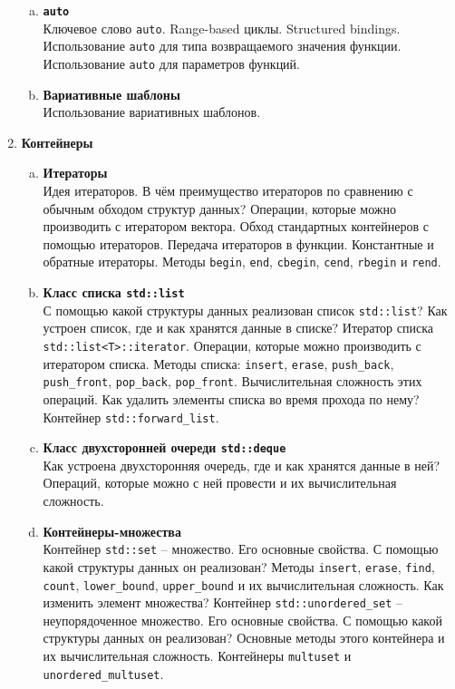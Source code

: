 \documentclass{article}
\begin{document}
\begin{enumerate}
\begin{enumerate}[a.]
\item \textbf{\texttt{auto}}\\
Ключевое слово \texttt{auto}. Range-based циклы. Structured bindings.
Использование \texttt{auto} для типа возвращаемого значения функции. Использование \texttt{auto} для параметров функций.


\item \textbf{Вариативные шаблоны}\\
Использование вариативных шаблонов.
\end{enumerate}




\item \textbf{Контейнеры}
\begin{enumerate}[a.]

\item \textbf{Итераторы}\\
Идея итераторов. В чём преимущество итераторов по сравнению с обычным обходом структур данных? Операции, которые можно производить с итератором вектора. Обход стандартных контейнеров с помощью итераторов. Передача итераторов в функции. Константные и обратные итераторы. Методы \texttt{begin}, \texttt{end}, \texttt{cbegin}, \texttt{cend}, \texttt{rbegin} и \texttt{rend}.

\item \textbf{Класс списка \texttt{std::list}}\\
С помощью какой структуры данных реализован список \texttt{std::list}? Как устроен список, где и как хранятся данные в списке? Итератор списка \texttt{std::list<T>::iterator}. Операции, которые можно производить с итератором списка. Методы списка: \texttt{insert}, \texttt{erase}, \texttt{push\_back}, \texttt{push\_front}, \texttt{pop\_back}, \texttt{pop\_front}. Вычислительная сложность этих операций.  Как удалить элементы списка во время прохода по нему? 
Контейнер \texttt{std::forward\_list}.

\item \textbf{Класс двухсторонней очереди \texttt{std::deque}}\\
Как устроена двухсторонняя очередь, где и как хранятся данные в ней? Операций, которые можно с ней провести и их вычислительная сложность.

\item \textbf{Контейнеры-множества}\\
Контейнер \texttt{std::set} -- множество. Его основные свойства. С помощью какой структуры данных он реализован? Методы \texttt{insert}, \texttt{erase}, \texttt{find}, \texttt{count}, \texttt{lower\_bound}, \texttt{upper\_bound} и их вычислительная сложность. Как изменить элемент множества? Контейнер \texttt{std::unordered\_set} -- неупорядоченное множество. Его основные свойства. С помощью какой структуры данных он реализован? Основные методы этого контейнера и их вычислительная сложность. Контейнеры \texttt{multuset} и \texttt{unordered\_multuset}.


\end{enumerate}
\end{enumerate}
\end{document}
